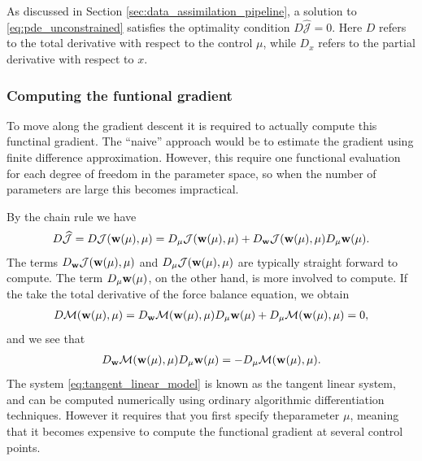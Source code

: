 As discussed in Section \ref{sec:data_assimilation_pipeline}, a
solution to \eqref{eq:pde_unconstrained} satisfies the optimality
condition $D  \widehat{\mathcal{J}} = 0$. Here $D$ refers to the
total derivative with respect to the control $\mu$, while $D_{x}$
refers to the partial derivative with respect to $x$.

\subsubsection{Computing the funtional gradient} 
To move along the gradient descent it is required to actually
compute this functinal gradient. The ``naive'' approach would be to
estimate the gradient using finite difference approximation. However,
this require one functional evaluation for each degree of freedom in
the parameter space, so when the number of parameters are large this
becomes impractical.

By the chain rule we have
\begin{align*}
  D  \widehat{\mathcal{J}}  =  D  \mathcal{J}(\mathbf{w}(\mu), \mu) =
   D_{\mu}\mathcal{J}(\mathbf{w}(\mu), \mu) + D_{\mathbf{w}}\mathcal{J}(\mathbf{w}(\mu), \mu) D_{\mu}\mathbf{w}(\mu).
\end{align*}
The terms $D_{\mathbf{w}}\mathcal{J}(\mathbf{w}(\mu), \mu)$ and
$D_{\mu}\mathcal{J}(\mathbf{w}(\mu), \mu)$ are typically straight forward
to compute. The term $D_{\mu}\mathbf{w}(\mu)$, on the other hand, is more
involved to compute.  If the take the total derivative of the
force balance equation, we obtain
\begin{align*}
  D \mathcal{M}(\mathbf{w}(\mu), \mu) =
  D_{\mathbf{w}} \mathcal{M}(\mathbf{w}(\mu), \mu) D_{\mu}\mathbf{w}(\mu)
  +  D_{\mu} \mathcal{M}(\mathbf{w}(\mu), \mu)  = 0,
\end{align*}
and we see that
\begin{align}
  D_{\mathbf{w}} \mathcal{M}(\mathbf{w}(\mu), \mu)  D_{\mu}\mathbf{w}(\mu) = - D_{\mu} \mathcal{M}(\mathbf{w}(\mu), \mu).
  \label{eq:tangent_linear_model}
\end{align}
The system \eqref{eq:tangent_linear_model} is known as the tangent
linear system, and can be computed numerically using ordinary
algorithmic differentiation techniques. However it requires that you
first specify theparameter $\mu$, meaning that it becomes expensive to
compute the functional gradient at several control points. 

